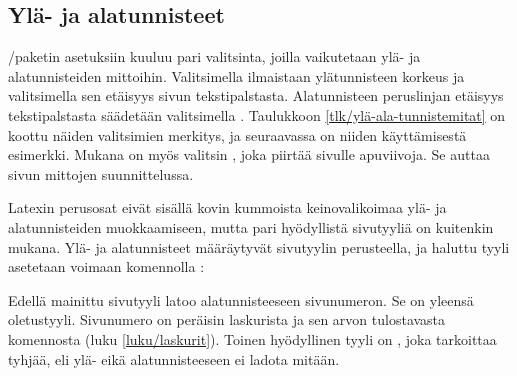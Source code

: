 \subsection{Ylä- ja alatunnisteet}
\label{luku/ylä-ala-tunnisteet}

\-/paketin asetuksiin kuuluu pari valitsinta, joilla
vaikutetaan ylä- ja alatunnisteiden mittoihin. Valitsimella 
ilmaistaan ylätunnisteen korkeus ja valitsimella  sen
etäisyys sivun tekstipalstasta. Alatunnisteen peruslinjan etäisyys
tekstipalstasta säädetään valitsimella . Taulukkoon
\ref{tlk/ylä-ala-tunnistemitat} on koottu näiden valitsimien merkitys,
ja seuraavassa on niiden käyttämisestä esimerkki. Mukana on myös
valitsin , joka piirtää sivulle apuviivoja. Se auttaa
sivun mittojen suunnittelussa.

\begin{koodilohkosis}
\geometry{head=24bp, headsep=8bp, footskip=12mm, showframe}
\end{koodilohkosis}


\noindent
Latexin perusosat eivät sisällä kovin kummoista keinovalikoimaa ylä- ja
alatunnisteiden muokkaamiseen, mutta pari hyödyllistä sivutyyliä on
kuitenkin mukana. Ylä- ja alatunnisteet määräytyvät sivutyylin
perusteella, ja haluttu tyyli asetetaan voimaan komennolla
:

\begin{koodilohkosis}
\pagestyle{plain}
\end{koodilohkosis}

\noindent
Edellä mainittu sivutyyli  latoo alatunnisteeseen
sivunumeron. Se on yleensä oletustyyli. Sivunumero on peräisin
laskurista  ja sen arvon tulostavasta komennosta
 (luku \ref{luku/laskurit}). Toinen hyödyllinen tyyli
on , joka tarkoittaa tyhjää, eli ylä- eikä
alatunnisteeseen ei ladota mitään.

